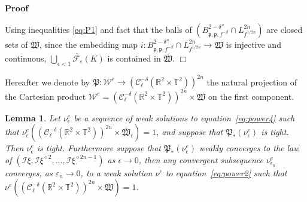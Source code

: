 \documentclass[a4paper,10pt]{article}
\newcommand{\asterisk}{\mathord{*}}
\newenvironment{proof}{\noindent\textbf{Proof\ }}{\hspace*{\fill}$\Box$\medskip}
\newtheorem{lemma}[theorem]{Lemma}
\begin{document}
\begin{proof}
  \
  
  Using inequalities {\eqref{eq:P1}} and fact that the balls of $(B^{2 -
  \delta''}_{\mathfrak{p}, \mathfrak{p,} f^{- \beta}} \cap L^{2 n}_{f^{1 / 2
  n}})$ are closed sets of $\mathfrak{W}$, since the embedding map $i : B^{2 -
  \delta''}_{\mathfrak{p}, \mathfrak{p,} f^{- \beta}} \cap L^{2 n}_{f^{1 / 2
  n}} \rightarrow \mathfrak{W}$ is injective and continuous,
  $\overline{\bigcup_{\epsilon < 1} \mathcal{F}_{\epsilon} (K)}$ is contained
  in $\overline{\mathfrak{W}}$.
\end{proof}

Hereafter we denote by $\mathfrak{P :} \mathcal{W}^e \rightarrow
(\mathcal{C}^{- \delta}_{\ell} (\mathbb{R}^2 \times \mathbb{T}^2))^{2 n}$ the
natural projection of the Cartesian product $\mathcal{W}^e = (\mathcal{C}^{-
\delta}_{\ell} (\mathbb{R}^2 \times \mathbb{T}^2))^{2 n} \times \mathfrak{W}$
on the first component.

\begin{lemma}
  \label{lemma_tightness}Let $\nu_{\epsilon}^e$ be a sequence of weak
  solutions to equation~{\eqref{eq:power4}} such that $\nu^e_{\epsilon}
  ((\mathcal{C}^{- \delta}_{\ell} (\mathbb{R}^2 \times \mathbb{T}^2))^{2 n}
  \times \mathfrak{\bar{W}}_{\epsilon}) = 1$, and suppose that
  $\mathfrak{P}_{\asterisk} (\nu_{\epsilon}^e)$ is tight. Then
  $\nu_{\epsilon}^e$ is tight. Furthermore suppose that
  $\mathfrak{P}_{\asterisk} (\nu_{\epsilon}^e)$ weakly converges to the law of
  $(\mathcal{I} \xi, \mathcal{I} \xi^{\diamond 2}, \ldots, \mathcal{I}
  \xi^{\diamond 2 n - 1})$ as $\epsilon \rightarrow 0$, then any convergent
  subsequence $\nu_{\epsilon_n}^e$ converges, as $\varepsilon_n \rightarrow
  0$, to a weak solution $\nu^e$ to equation~{\eqref{eq:power2}} such that
  $\nu^e ((\mathcal{C}^{- \delta}_{\ell} (\mathbb{R}^2 \times
  \mathbb{T}^2))^{2 n} \times \overline{\mathfrak{W}}) = 1$.
\end{lemma}
\end{document}
